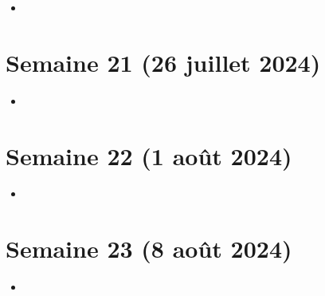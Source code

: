 \documentclass[a4paper,12pt]{article}
\begin{document}
\begin{itemize}
  \item ~
\end{itemize}

\section{Semaine 21 (26 juillet 2024)}

\begin{itemize}
  \item ~
\end{itemize}

\section{Semaine 22 (1 août 2024)}

\begin{itemize}
  \item ~
\end{itemize}

\section{Semaine 23 (8 août 2024)}

\begin{itemize}
  \item ~
\end{itemize}
\end{document}

